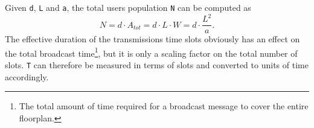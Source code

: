 Given \texttt{d}, \texttt{L} and \texttt{a}, the total users population
\texttt{N} can be computed as
$$ N = d \cdot A_{tot} = d \cdot L \cdot W = d \cdot \frac{L^{2}}{a}.$$
The effective duration of the transmissions time slots obviously has an effect
on the total broadcast time\footnote{The total amount of time required for a
broadcast message to cover the entire floorplan.}, but it is only a scaling
factor on the total number of slots. \texttt{T} can therefore be measured in
terms of slots and converted to units of time accordingly.
